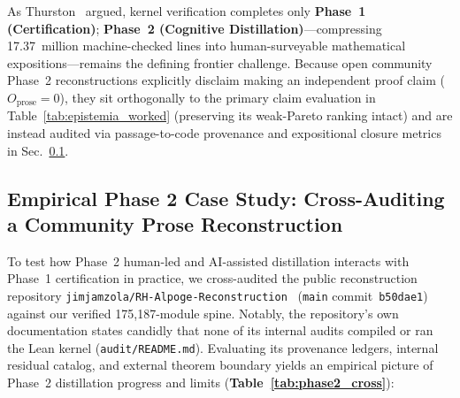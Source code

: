 \documentclass[11pt,a4paper]{article}
\begin{document}
As Thurston~\cite{thurston1994} argued, kernel verification completes only \textbf{Phase~1 (Certification)}; \textbf{Phase~2 (Cognitive Distillation)}---compressing 17.37~million machine-checked lines into human-surveyable mathematical expositions---remains the defining frontier challenge. Because open community Phase~2 reconstructions explicitly disclaim making an independent proof claim ($O_{\mathrm{prose}} = 0$), they sit orthogonally to the primary claim evaluation in Table~\ref{tab:epistemia_worked} (preserving its weak-Pareto ranking intact) and are instead audited via passage-to-code provenance and expositional closure metrics in Sec.~\ref{sec:phase2_cross_audit}.

\subsection{Empirical Phase 2 Case Study: Cross-Auditing a Community Prose Reconstruction}
\label{sec:phase2_cross_audit}

To test how Phase~2 human-led and AI-assisted distillation interacts with Phase~1 certification in practice, we cross-audited the public reconstruction repository \texttt{jimjamzola/\allowbreak RH-Alpoge-Reconstruction}~\cite{adriazola2026} (\texttt{main} commit~\texttt{b50dae1}) against our verified 175,187-module spine. Notably, the repository's own documentation states candidly that none of its internal audits compiled or ran the Lean kernel (\texttt{audit/README.md}). Evaluating its provenance ledgers, internal residual catalog, and external theorem boundary yields an empirical picture of Phase~2 distillation progress and limits (\textbf{Table~\ref{tab:phase2_cross}}):
\end{document}
